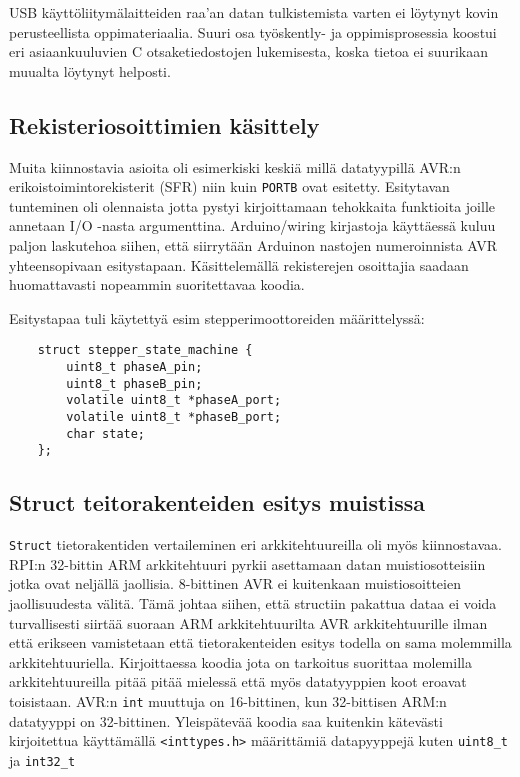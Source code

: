 \documentclass[]{article} %
\numberwithin{equation}{section}
\numberwithin{figure}{section}
\numberwithin{table}{section}
\begin{document}
USB käyttöliitymälaitteiden raa'an datan tulkistemista varten ei löytynyt kovin perusteellista oppimateriaalia.
Suuri osa työskently- ja oppimisprosessia koostui eri asiaankuuluvien C otsaketiedostojen lukemisesta, koska tietoa ei suurikaan muualta löytynyt helposti. 

\subsection{Rekisteriosoittimien käsittely}
\label{Rekisteriosoittimien kasittely}

Muita kiinnostavia asioita oli esimerkiski keskiä millä datatyypillä AVR:n erikoistoimintorekisterit (SFR) niin kuin \verb+PORTB+ ovat esitetty.
Esitytavan tunteminen oli olennaista jotta pystyi kirjoittamaan tehokkaita funktioita joille annetaan I/O -nasta argumenttina. Arduino/wiring kirjastoja käyttäessä kuluu paljon laskutehoa siihen, että siirrytään Arduinon nastojen numeroinnista AVR yhteensopivaan esitystapaan. Käsittelemällä rekisterejen osoittajia saadaan huomattavasti nopeammin suoritettavaa koodia.

Esitystapaa tuli käytettyä esim stepperimoottoreiden määrittelyssä:

\begin{verbatim}
    struct stepper_state_machine {
        uint8_t phaseA_pin;
        uint8_t phaseB_pin;
        volatile uint8_t *phaseA_port;
        volatile uint8_t *phaseB_port;
        char state;
    };
\end{verbatim}

\subsection{Struct teitorakenteiden esitys muistissa}

\verb+Struct+ tietorakentiden vertaileminen eri arkkitehtuureilla oli myös kiinnostavaa.
RPI:n 32-bittin ARM arkkitehtuuri pyrkii asettamaan datan muistiosotteisiin jotka ovat neljällä jaollisia. 8-bittinen AVR ei kuitenkaan muistiosoitteien jaollisuudesta välitä.
Tämä johtaa siihen, että structiin pakattua dataa ei voida turvallisesti siirtää suoraan ARM arkkitehtuurilta AVR arkkitehtuurille ilman että erikseen vamistetaan että tietorakenteiden esitys todella on sama molemmilla arkkitehtuuriella.
Kirjoittaessa koodia jota on tarkoitus suorittaa molemilla arkkitehtuureilla pitää pitää mielessä että myös datatyyppien koot eroavat toisistaan. AVR:n \verb+int+ muuttuja on 16-bittinen, kun 32-bittisen ARM:n datatyyppi on 32-bittinen.
Yleispätevää koodia saa kuitenkin kätevästi kirjoitettua käyttämällä \verb+<inttypes.h>+ määrittämiä datapyyppejä kuten \verb+uint8_t+ ja \verb+int32_t+
\end{document}
